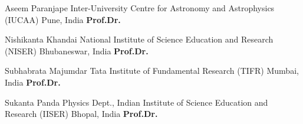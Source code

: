 


\begin{cvhonors}


\cvhonor
{Aseem Paranjape} %
{Inter-University Centre for Astronomy and Astrophysics (IUCAA)} %
{Pune, India} %
{\textbf{  Prof.Dr.}} %


\cvhonor
{Nishikanta Khandai} %
{National Institute of Science Education and Research (NISER)} %
{Bhubaneswar, India} %
{\textbf{  Prof.Dr.}} %


\cvhonor
{Subhabrata Majumdar} %
{Tata Institute of Fundamental Research (TIFR)} %
{Mumbai, India} %
{\textbf{  Prof.Dr.}} %



\cvhonor
{Sukanta Panda} %
{Physics Dept., Indian Institute of Science Education and Research (IISER)} %
{Bhopal, India} %
{\textbf{  Prof.Dr.}} %


\end{cvhonors}

